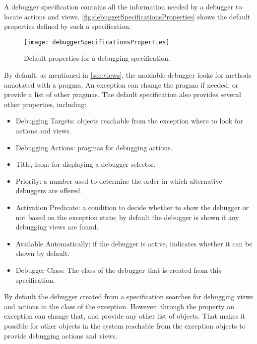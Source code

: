 \documentclass[sigplan,anonymous,review,10pt]{acmart}
\newcommand{\GT}{\lst{GT}\xspace} %
\begin{document}
A debugger specification contains all the information needed by a debugger to locate actions and views.
\autoref{fig:debuggerSpecificationsProperties} shows the default properties defined by such a specification.

\begin{figure}[h]
  \texttt{[image: debuggerSpecificationsProperties]}
  \caption{Default properties for a debugging specification.}
  \label{fig:debuggerSpecificationsProperties}
\end{figure}

By default, as mentioned in \autoref{sec:views}, the moldable \GT debugger looks for methods annotated with a  pragma.
An exception can change the pragma if needed, or provide a list of other pragmas.
The default specification also provides several other properties, including:
\begin{itemize}
\item Debugging Targets: objects reachable from the exception where to look for actions and views.
\item Debugging Actions: pragmas for debugging actions.
\item Title, Icon: for displaying a debugger selector.
\item Priority: a number used to determine the order in which alternative debuggers are offered.
\item Activation Predicate: a condition to decide whether to show the debugger or not based on the exception state; by default the debugger is shown if any debugging views are found.
\item Available Automatically: if the debugger is active, indicates whether it can be shown by default.
\item Debugger Class: The class of the debugger that is created from this specification.
\end{itemize}

By default the debugger created from a specification searches for debugging views and actions in the class of the exception.
However, through the  property an exception can change that, and provide any other list of objects.
That makes it possible for other objects in the system reachable from the exception objects to provide debugging actions and views.

\end{document}

